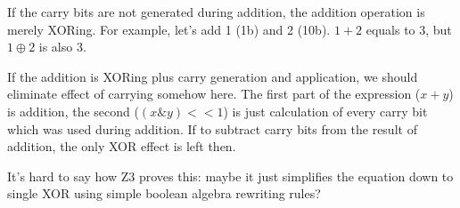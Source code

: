 If the carry bits are not generated during addition, the addition operation is merely XORing.
For example, let's add 1 (1b) and 2 (10b). $1 + 2$ equals to 3, but $1 \oplus 2$ is also 3.

If the addition is XORing plus carry generation and application, we should eliminate effect of carrying somehow here.
The first part of the expression ($x + y$) is addition, the second ($(x \& y)<<1$) is just calculation of every carry bit which was used during addition.
If to subtract carry bits from the result of addition, the only XOR effect is left then.

It's hard to say how Z3 proves this:
maybe it just simplifies the equation down to single XOR using simple boolean algebra rewriting rules?

